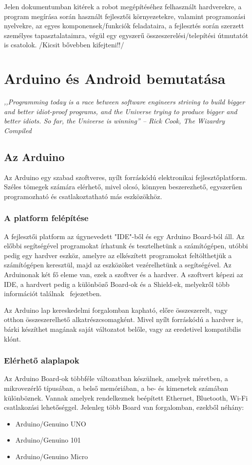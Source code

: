 \documentclass[]{thesis-ekf}
\theoremstyle{definition}
\begin{document}
Jelen dokumentumban kitérek a robot megépítéséhez felhasznált hardverekre, a program megírása során használt fejlesztői környezetekre, valamint programozási nyelvekre, az egyes komponensek/funkciók feladataira, a fejlesztés során szerzett személyes tapasztalataimra, végül egy egyszerű összeszerelési/telepítési útmutatót is csatolok. /Kicsit bővebben kifejteni!!/
\chapter{Arduino és Android bemutatása}
\emph{,,Programming today is a race between software engineers striving to build bigger and better idiot-proof programs, and the Universe trying to produce bigger and better idiots. So far, the Universe is winning'' -- Rick Cook, The Wizardry Compiled}
\section{Az Arduino}
Az Arduino egy szabad szoftveres, nyílt forráskódú elektronikai fejlesztőplatform. Széles tömegek számára elérhető, mivel olcsó, könnyen beszerezhető, egyszerűen programozható és csatlakoztatható más eszközökhöz.
\subsection{A platform felépítése}
A fejlesztői platform az úgynevedett "IDE"-ből és egy Arduino Board-ból áll. Az előbbi segítségével programokat írhatunk és tesztelhetünk a számítógépen, utóbbi pedig egy hardver eszköz, amelyre az elkészített programokat feltölthetjük a számítógépen keresztül, majd az eszközöket vezérelhetünk a segítségével. Az Arduinonak két fő eleme van, ezek a szoftver és a hardver. A szoftvert képezi az IDE, a hardvert pedig a különböző Board-ok és a Shield-ek, melyekről több információt találnak \az{\ref{arduino-boards}}~fejezetben.

Az Arduino lap kereskedelmi forgalomban kapható, előre összeszerelt, vagy otthon összeszerelhető alkatrészcsomagként. Mivel nyílt forráskódú a hardver is, bárki készíthet magának saját változatot belőle, vagy az eredetivel kompatibilis klónt.
\subsection{Elérhető alaplapok}\label{arduino-boards}
Az Arduino Board-ok többféle változatban készülnek, amelyek méretben, a mikrovezérlő típusában, a belső memóriában, a be- és kimenetek számában különböznek. Vannak amelyek rendelkeznek beépített Ethernet, Bluetooth, Wi-Fi csatlakozási lehetőséggel. Jelenleg több Board van forgalomban, ezekből néhány:
\begin{itemize}
	\item Arduino/Genuino UNO
	\item Arduino/Genuino 101
	\item Arduino/Genuino Micro
\end{itemize}
\end{document}
